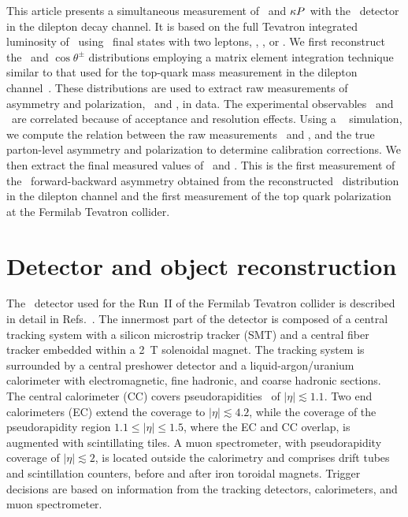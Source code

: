 \documentclass[aps,prd,twocolumn,showpacs,superscriptaddress,groupedaddress,floatfix]{revtex4}
\begin{document}
This article presents a simultaneous measurement of \Att\ and $\kappa P^{}_{}$ with the \dzero\ detector  in the dilepton decay channel.
It is based on the  full Tevatron integrated luminosity of \lumi\ using  \ttbar\ final states with two leptons, \ee, \emu, or \mumu.
We first reconstruct the \dyttbar\ and  $\cos\theta^{\pm}$ distributions employing
a matrix element integration technique similar to that used for the top-quark mass measurement in the dilepton channel~\cite{Abazov:2011fc}.
These distributions are used to extract  raw measurements of asymmetry and polarization, \Attraw\ and \Praw, in  data.
The experimental observables \Attraw\ and \Praw\  are  correlated
because of acceptance and resolution effects.
Using a \mcatnlo~\cite{Frixione:2002ik, Frixione:2008ym} simulation, we compute the relation between the raw measurements \Attraw\ and \Praw,  and the true parton-level asymmetry and polarization to determine calibration corrections.
We then  extract the final measured values of \Att\ and \Ptt.
This is the first measurement  of the \ttbar\ forward-backward asymmetry
obtained from the reconstructed \dyttbar\ distribution
in the dilepton channel
and the first measurement of the top quark polarization at the Fermilab Tevatron collider.
 


\makeatletter{}
\section{Detector and object reconstruction}
\label{sec:detector}


The \dzero\ detector used for the Run~II of the Fermilab Tevatron collider is described in detail in Refs.~\cite{run1det,run2det,Abolins2008,Angstadt2010}.
The innermost part of the detector is composed of
a central tracking system with a silicon microstrip tracker (SMT) and
a central fiber tracker embedded within a 2~T solenoidal
magnet.  The tracking system is surrounded by a central preshower
detector and a liquid-argon/uranium calorimeter with
electromagnetic, fine hadronic, and coarse hadronic sections. The 
central calorimeter (CC) covers pseudorapidities~\cite{Note1} of
$|\eta|\lesssim 1.1$.
Two end calorimeters (EC) extend the coverage to $ |\eta| \lesssim 4.2$, while
the coverage of the  pseudorapidity region $1.1\leq|\eta|\leq 1.5$, where the EC and CC overlap, is augmented with  scintillating tiles.
A muon
spectrometer, with pseudorapidity coverage of $|\eta|\lesssim 2$,
is located outside the calorimetry and  comprises  drift
tubes and scintillation counters, before and after iron toroidal magnets.
Trigger decisions are based
on information from the tracking detectors,
calorimeters, and muon spectrometer.
\end{document}
